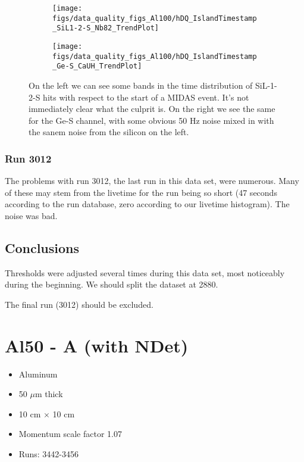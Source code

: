 \documentclass[a4paper]{article}
\begin{document}
\begin{figure}
  \centering
  \begin{subfigure}{0.5\textwidth}
    \texttt{[image: figs/data\_quality\_figs\_Al100/hDQ\_IslandTimestamp\_SiL1-2-S\_Nb82\_TrendPlot]}
  \end{subfigure}%
  \begin{subfigure}{0.5\textwidth}
    \texttt{[image: figs/data\_quality\_figs\_Al100/hDQ\_IslandTimestamp\_Ge-S\_CaUH\_TrendPlot]}
  \end{subfigure}
  \caption{On the left we can see some bands in the time distribution
    of SiL-1-2-S hits with respect to the start of a MIDAS event. It's
    not immediately clear what the culprit is. On the right we see the
    same for the Ge-S channel, with some obvious 50 Hz noise mixed in
    with the sanem noise from the silicon on the left.}
  \label{fig:al100_timestamp_banding}
\end{figure}


\subsubsection{Run 3012}

The problems with run 3012, the last run in this data set, were numerous. Many of these may stem
from the livetime for the run being so short (47 seconds according to the run database, zero according
to our livetime histogram). The noise was bad.


\subsection{Conclusions}

Thresholds were adjusted several times during this data set, most noticeably during the beginning.
We should split the dataset at 2880.

The final run (3012) should be excluded.


\section{Al50 - A (with NDet)}
\begin{itemize}
  \item Aluminum
  \item 50 $\mu$m thick
  \item 10 cm $\times$ 10 cm
  \item Momentum scale factor 1.07
  \item Runs: 3442-3456
\end{itemize}
\end{document}
